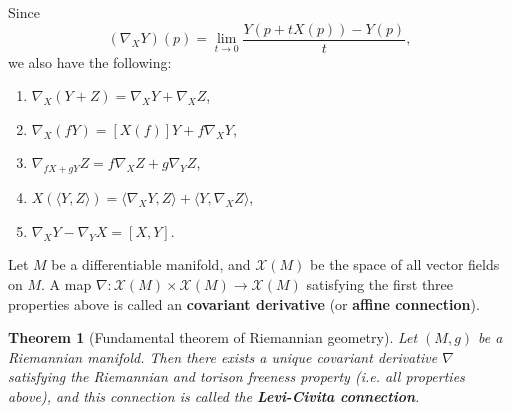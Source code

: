 \documentclass[letter-paper]{tufte-book}
\newtheorem{theorem}{\color{pastel-blue}Theorem}[section]
\begin{document}
Since
\begin{equation*}
  (\nabla_X Y)(p) = \lim_{t\to 0}\frac{Y(p + tX(p)) - Y(p)}{t},
\end{equation*}
we also have the following:
\begin{enumerate}
  \item $\nabla_X (Y+Z) = \nabla_X Y +\nabla_X Z$,
  \item $\nabla_X (fY) = [X(f)]Y + f\nabla_X Y$,
  \item $\nabla_{fX + gY} Z = f \nabla_X Z + g\nabla_Y Z$,
  \item $X(\langle Y,Z\rangle) = \langle \nabla_X Y, Z\rangle + \langle Y, \nabla_X Z\rangle$,
  \item $\nabla_X Y - \nabla_Y X = [X, Y]$.
\end{enumerate}

Let $M$ be a differentiable manifold, and $\mathcal{X}(M)$ be the space of all vector fields on $M$. A map $\nabla: \mathcal{X}(M) \times \mathcal{X}(M) \to \mathcal{X}(M)$ satisfying the first three properties above is called an \textbf{covariant derivative} (or \textbf{affine connection}).

\begin{theorem}[Fundamental theorem of Riemannian geometry]
  Let $(M,g)$ be a Riemannian manifold. Then there exists a unique covariant derivative $\nabla$ satisfying the Riemannian and torison freeness property (i.e. all properties above), and this connection is called the \textbf{Levi-Civita connection}.
\end{theorem}
  
\end{document}

